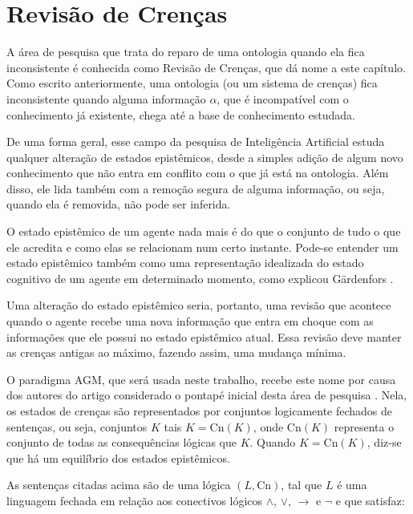 
\chapter{Revisão de Crenças}

\lettrine{A}{} área de pesquisa que trata do reparo de uma ontologia quando ela fica inconsistente é conhecida como Revisão de Crenças, que dá nome a este capítulo. Como escrito anteriormente, uma ontologia (ou um sistema de crenças) fica inconsistente quando alguma informação $ \alpha $, que é incompatível com o conhecimento já existente, chega até a base de conhecimento estudada. 

De uma forma geral, esse campo da pesquisa de Inteligência Artificial estuda qualquer alteração de estados epistêmicos, desde a simples adição de algum novo conhecimento que não entra em conflito com o que já está na ontologia. Além disso, ele lida também com a remoção segura de alguma informação, ou seja, quando ela é removida, não pode ser inferida.

O estado epistêmico de um agente nada mais é do que o conjunto de tudo o que ele acredita e como elas se relacionam num certo instante. Pode-se entender um estado epistêmico também como uma representação idealizada do estado cognitivo de um agente em determinado momento, como explicou Gärdenfors \cite{revisaoGardenfors}.

Uma alteração do estado epistêmico seria, portanto, uma revisão que acontece quando o agente recebe uma nova informação que entra em choque com as informações que ele possui no estado epistêmico atual. Essa revisão deve manter as crenças antigas ao máximo, fazendo assim, uma mudança mínima.

O paradigma AGM, que será usada neste trabalho, recebe este nome por causa dos autores do artigo considerado o pontapé inicial desta área de pesquisa \cite{revisaoAGM}. Nela, os estados de crenças são representados por conjuntos logicamente fechados de sentenças, ou seja, conjuntos $ K $ tais $ K = \text{Cn}(K) $, onde $ \text{Cn}(K) $ representa o conjunto de todas as consequências lógicas que $ K $. Quando $ K = \text{Cn}(K) $, diz-se que há um equilíbrio dos estados epistêmicos. 

As sentenças citadas acima são de uma lógica $ (L, \text{Cn}) $, tal que $ L $ é uma linguagem fechada em relação aos conectivos lógicos $ \land $, $ \lor $, $ \to $ e $ \lnot $ e que satisfaz:


